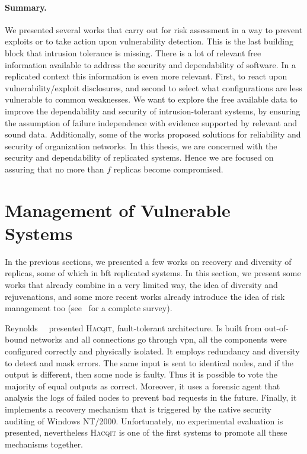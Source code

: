 \paragraph{Summary.} 
We presented several works that carry out for risk assessment in a way to prevent exploits or to take action upon vulnerability detection. 
This is the last building block that intrusion tolerance is missing. 
There is a lot of relevant free information available to address the security and dependability of software. 
In a replicated context this information is even more relevant. 
First, to react upon vulnerability/exploit disclosures, and second to select what configurations are less vulnerable to common weaknesses. 
We want to explore the free available data to improve the dependability and security of intrusion-tolerant systems, by ensuring the assumption of failure independence with evidence supported by relevant and sound data.
Additionally, some of the works proposed solutions for reliability and security of organization networks. 
In this thesis, we are concerned with the security and dependability of replicated systems. Hence we are focused on assuring that no more than $f$ replicas become compromised.



\section{Management of Vulnerable Systems}
In the previous sections, we presented a few works on recovery and diversity of replicas, some of which in \gls{bft} replicated systems.
In this section, we present some works that already combine in a very limited way, the idea of diversity and rejuvenations, and some more recent works already introduce the idea of risk management too (see~\cite{Yuan:2014} for a complete survey).


Reynolds~\etal{}~\cite{Reynolds:2002} presented \textsc{Hacqit}, fault-tolerant architecture. 
Is built from out-of-bound networks and all connections go through \gls{vpn}, all the components were configured correctly and physically isolated.
It employs redundancy and diversity to detect and mask errors.
The same input is sent to identical nodes, and if the output is different, then some node is faulty. Thus it is possible to vote the majority of equal outputs as correct.
Moreover, it uses a forensic agent that analysis the logs of failed nodes to prevent bad requests in the future.
Finally, it implements a recovery mechanism that is triggered by the native security auditing of Windows NT/2000.
Unfortunately, no experimental evaluation is presented, nevertheless \textsc{Hacqit} is one of the first systems to promote all these mechanisms together.


